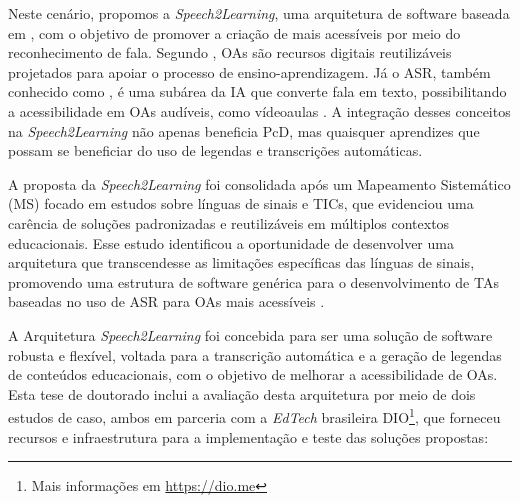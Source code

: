 Neste cenário, propomos a \textit{Speech2Learning}, uma arquitetura de software baseada em , com o objetivo de promover a criação de  mais acessíveis por meio do reconhecimento de fala. Segundo , OAs são recursos digitais reutilizáveis projetados para apoiar o processo de ensino-aprendizagem. Já o ASR, também conhecido como , é uma subárea da IA que converte fala em texto, possibilitando a acessibilidade em OAs audíveis, como vídeoaulas \cite{Jurafsky2024}. A integração desses conceitos na \textit{Speech2Learning} não apenas beneficia PcD, mas quaisquer aprendizes que possam se beneficiar do uso de legendas e transcrições automáticas.

A proposta da \textit{Speech2Learning} foi consolidada após um Mapeamento Sistemático (MS) focado em estudos sobre línguas de sinais e TICs, que evidenciou uma carência de soluções padronizadas e reutilizáveis em múltiplos contextos educacionais. Esse estudo identificou a oportunidade de desenvolver uma arquitetura que transcendesse as limitações específicas das línguas de sinais, promovendo uma estrutura de software genérica para o desenvolvimento de TAs baseadas no uso de ASR para OAs mais acessíveis \cite{FalvoJr2020_FIE, FalvoJr2020_SBIE, FalvoJr2021_RENOTE}.

A Arquitetura \textit{Speech2Learning} foi concebida para ser uma solução de software robusta e flexível, voltada para a transcrição automática e a geração de legendas de conteúdos educacionais, com o objetivo de melhorar a acessibilidade de OAs. Esta tese de doutorado inclui a avaliação desta arquitetura por meio de dois estudos de caso, ambos em parceria com a \textit{EdTech} brasileira DIO\footnote{Mais informações em \url{https://dio.me}}, que forneceu recursos e infraestrutura para a implementação e teste das soluções propostas:

